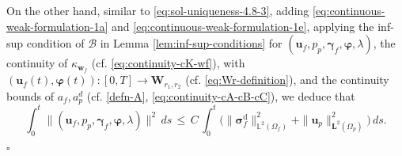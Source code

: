 \documentclass[11pt]{article}
\numberwithin{equation}{section}
\newcommand{\ds}{\displaystyle}
\newcommand{\bgamma}{{\boldsymbol\gamma}}
\newcommand{\bbeta}{{\boldsymbol\eta}}
\newcommand{\bsi}{{\boldsymbol\sigma}}
\newcommand{\bvarphi}{{\boldsymbol\varphi}}
\newcommand{\btau}{{\boldsymbol\tau}}
\newcommand{\bv}{{\mathbf{v}}}
\newcommand{\bw}{{\mathbf{w}}}
\newcommand{\f}{\mathbf{f}}
\newcommand{\bu}{\mathbf{u}}
\newcommand{\bt}{{\mathbf{t}}}
\newcommand{\0}{{\mathbf{0}}}
\def\bX{\mathbf{X}}
\def\bV{\mathbf{V}}
\def\bW{\mathbf{W}}
\newcommand{\bL}{\mathbf{L}}
\newcommand\bbX{\mathbb{X}}
\newcommand\bbL{\mathbb{L}}
\newcommand{\cB}{\mathcal{B}}
\def\L{\mathrm{L}}
\def\W{\mathrm{W}}
\def\rd{\mathrm{d}}
\newenvironment{proof}{\noindent{\it Proof.}}{\hfill$\square$}
\numberwithin{equation}{section}
\begin{document}
\begin{proof}
On the other hand, similar to \eqref{eq:sol-uniqueness-4.8-3}, adding \eqref{eq:continuous-weak-formulation-1a} and \eqref{eq:continuous-weak-formulation-1e}, applying the inf-sup condition of $\cB$ in Lemma \ref{lem:inf-sup-conditions} for $(\bu_f, p_p, \bgamma_f, \bvarphi, \lambda)$, the continuity of $\kappa_{\bw_f}$ (cf. \eqref{eq:continuity-cK-wf}), with $(\bu_f(t),\bvarphi(t)):[0,T]\to \bW_{r_1,r_2}$ (cf. \eqref{eq:Wr-definition}), and the continuity bounds of $a_f, a^d_p$ (cf. \eqref{defn-A}, \eqref{eq:continuity-cA-cB-cC}), we deduce that
\begin{equation}\label{eq:bound-unsteady-state-solution-3}
\int^t_0 \|(\bu_f, p_p, \bgamma_f, \bvarphi, \lambda)\|^2 \, ds 
\,\leq\, C\,\int^t_0 \Big( \| \bsi^\rd_f\|^2_{\bbL^2(\Omega_f)} + \|\bu_p\|^2_{\bL^2(\Omega_p)} \Big)\, ds.
\end{equation}
%


\end{proof}
\end{document}
